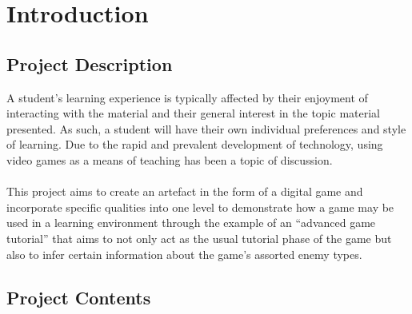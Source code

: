 
\chapter{Introduction} %

\label{Chapter1} %


\newcommand{\keyword}[1]{\textbf{#1}}
\newcommand{\tabhead}[1]{\textbf{#1}}
\newcommand{\code}[1]{\texttt{#1}}
\newcommand{\file}[1]{\1texttt{\bfseries#1}}
\newcommand{\option}[1]{\texttt{\itshape#1}}


\section{Project Description}
A student's learning experience is typically affected by their enjoyment of interacting with the material and their general interest in the topic material presented. As such, a student will have their own individual preferences and style of learning. Due to the rapid and prevalent development of technology, using video games as a means of teaching has been a topic of discussion.
\\\\
This project aims to create an artefact in the form of a digital game and incorporate specific qualities into one level to demonstrate how a game may be used in a learning environment through the example of an “advanced game tutorial” that aims to not only act as the usual tutorial phase of the game but also to infer certain information about the game’s assorted enemy types.

\section{Project Contents}
